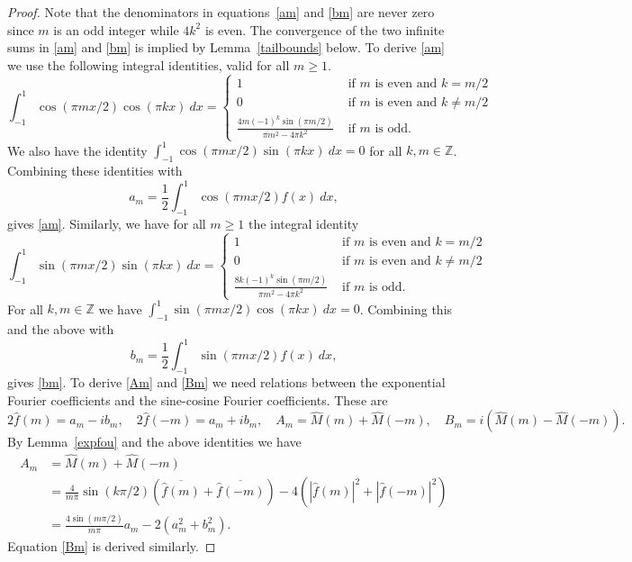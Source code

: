\documentclass[12pt]{article}
\numberwithin{equation}{section}
\begin{document}
\begin{proof} Note that the denominators in equations~\eqref{am} and \eqref{bm} are never zero since $m$ is an odd integer while $4k^2$ is even. The convergence of the two infinite sums in \eqref{am} and \eqref{bm} is implied by Lemma~\ref{tailbounds} below. To derive \eqref{am} we use the following integral identities, valid for all $m \geq 1$.
\[ \int_{-1}^1 \cos(\pi m x/2) \cos (\pi k x) \ dx = \begin{cases} 1 & \text{ if } m \text{ is even and } k = m/2 \\ 0&  \text{ if } m \text{ is even and } k \neq m/2 \\ \frac{4m (-1)^k \sin(\pi m /2)}{\pi m^2 - 4\pi k^2 }& \text{ if } m \text{ is odd. } \end{cases}\]
We also have the identity $\int_{-1}^1 \cos(\pi m x/2) \sin (\pi k x) \ dx = 0$ for all $k,m \in \mathbb{Z}$. Combining these identities with 
\[ a_m = \frac{1}{2} \int_{-1}^1 \cos(\pi m x /2) f(x) \ dx, \]
gives \eqref{am}. Similarly, we have for all $m \geq 1$ the integral identity
\[ \int_{-1}^1 \sin(\pi m x/2) \sin (\pi k x) \ dx = \begin{cases} 1 & \text{ if } m \text{ is even and } k = m/2 \\ 0&  \text{ if } m \text{ is even and } k \neq m/2 \\ \frac{8k (-1)^k\sin(\pi m /2)}{\pi m^2 - 4\pi k^2 }& \text{ if } m \text{ is odd. } \end{cases}\]
For all $k,m \in \mathbb{Z}$ we have $\int_{-1}^1 \sin(\pi m x/2) \cos(\pi k x) \ dx = 0$. Combining this and the above with 
\[ b_m = \frac{1}{2} \int_{-1}^1 \sin(\pi m x /2) f(x) \ dx, \]
gives \eqref{bm}. To derive \eqref{Am} and \eqref{Bm} we need relations between the exponential Fourier coefficients and the sine-cosine Fourier coefficients. These are
\[ 2\hat{f}(m) = a_m -ib_m , \quad 2\hat{f}(-m) = a_m +ib_m , \quad A_m = \hat{M}(m) + \hat{M}(-m), \quad B_m = i(\hat{M}(m)-\hat{M}(-m)).\]
By Lemma~\ref{expfou} and the above identities we have 
\begin{align*}
A_m &= \hat{M}(m)+\hat{M}(-m) \\
& = \frac{4}{m \pi}\sin(k \pi /2)\left( \overline{\hat{f}(m) }+\overline{\hat{f}(-m) } \right)- 4 \left( |\hat{f}(m) |^2+|\hat{f}(-m) |^2\right)\\
& = \frac{4 \sin \left(m\pi /2 \right)}{m \pi}  a_m - 2(a_m^2+b_m^2).\end{align*}
Equation \eqref{Bm} is derived similarly. 
\end{proof}
\end{document}
